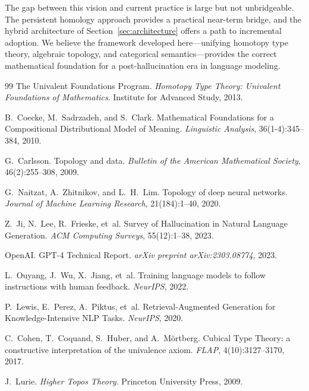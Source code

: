 \documentclass[11pt,a4paper,twocolumn]{article}
\theoremstyle{plain}
\theoremstyle{definition}
\begin{document}
The gap between this vision and current practice is large but not unbridgeable. The persistent homology approach provides a practical near-term bridge, and the hybrid architecture of Section~\ref{sec:architecture} offers a path to incremental adoption. We believe the framework developed here---unifying homotopy type theory, algebraic topology, and categorical semantics---provides the correct mathematical foundation for a post-hallucination era in language modeling.

\begin{thebibliography}{99}
The Univalent Foundations Program.
\textit{Homotopy Type Theory: Univalent Foundations of Mathematics}.
Institute for Advanced Study, 2013.

B.~Coecke, M.~Sadrzadeh, and S.~Clark.
Mathematical Foundations for a Compositional Distributional Model of Meaning.
\textit{Linguistic Analysis}, 36(1-4):345--384, 2010.

G.~Carlsson.
Topology and data.
\textit{Bulletin of the American Mathematical Society}, 46(2):255--308, 2009.

G.~Naitzat, A.~Zhitnikov, and L.~H.~Lim.
Topology of deep neural networks.
\textit{Journal of Machine Learning Research}, 21(184):1--40, 2020.

Z.~Ji, N.~Lee, R.~Frieske, et~al.
Survey of Hallucination in Natural Language Generation.
\textit{ACM Computing Surveys}, 55(12):1--38, 2023.

OpenAI.
GPT-4 Technical Report.
\textit{arXiv preprint arXiv:2303.08774}, 2023.

L.~Ouyang, J.~Wu, X.~Jiang, et~al.
Training language models to follow instructions with human feedback.
\textit{NeurIPS}, 2022.

P.~Lewis, E.~Perez, A.~Piktus, et~al.
Retrieval-Augmented Generation for Knowledge-Intensive NLP Tasks.
\textit{NeurIPS}, 2020.

C.~Cohen, T.~Coquand, S.~Huber, and A.~M\"ortberg.
Cubical Type Theory: a constructive interpretation of the univalence axiom.
\textit{FLAP}, 4(10):3127--3170, 2017.

J.~Lurie.
\textit{Higher Topos Theory}.
Princeton University Press, 2009.


\end{thebibliography}
\end{document}
